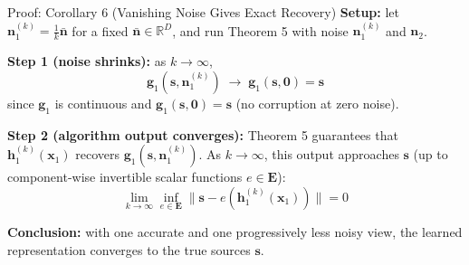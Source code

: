 \documentclass[aspectratio=169, 10pt]{beamer}
\begin{document}
\begin{frame}{Proof: Corollary 6 (Vanishing Noise Gives Exact Recovery)}
  \textbf{Setup:} let $\mathbf{n}_1^{(k)} = \frac{1}{k}\bar{\mathbf{n}}$ for a fixed
  $\bar{\mathbf{n}}\in\mathbb{R}^D$, and run Theorem 5 with noise $\mathbf{n}_1^{(k)}$
  and $\mathbf{n}_2$.

  \medskip
  \textbf{Step 1 (noise shrinks):} as $k\to\infty$,
  \[
    \mathbf{g}_1(\mathbf{s},\mathbf{n}_1^{(k)}) \;\longrightarrow\; \mathbf{g}_1(\mathbf{s},\mathbf{0}) = \mathbf{s}
  \]
  since $\mathbf{g}_1$ is continuous and $\mathbf{g}_1(\mathbf{s},\mathbf{0})=\mathbf{s}$
  (no corruption at zero noise).

  \medskip
  \textbf{Step 2 (algorithm output converges):} Theorem 5 guarantees that
  $\mathbf{h}_1^{(k)}(\mathbf{x}_1)$ recovers $\mathbf{g}_1(\mathbf{s},\mathbf{n}_1^{(k)})$.
  As $k\to\infty$, this output approaches $\mathbf{s}$ (up to component-wise invertible
  scalar functions $e\in\mathbf{E}$):
  \[
    \lim_{k\to\infty}\inf_{e\in\mathbf{E}}\bigl\|\mathbf{s} - e(\mathbf{h}_1^{(k)}(\mathbf{x}_1))\bigr\| = 0
  \]

  \medskip
  \textbf{Conclusion:} with one accurate and one progressively less noisy view,
  the learned representation converges to the true sources $\mathbf{s}$.
\end{frame}
\end{document}
